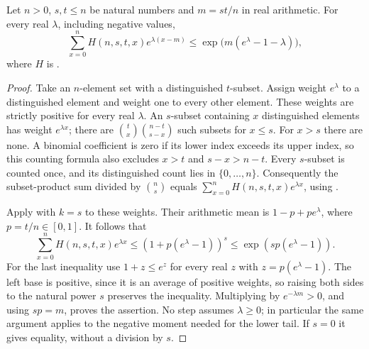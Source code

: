 \begin{lemma}
Let $n>0$, $s,t\le n$ be natural numbers and $m=st/n$ in real arithmetic.
For every real $\lambda$, including negative values,
\[
 \sum_{x=0}^n H(n,s,t,x)e^{\lambda(x-m)}
 \le \exp\bigl(m(e^\lambda-1-\lambda)\bigr),
\]
where $H$ is .
\end{lemma}
\begin{proof}
Take an $n$-element set with a distinguished $t$-subset. Assign weight
$e^\lambda$ to a distinguished element and weight one to every other
element. These weights are strictly positive for every real $\lambda$.
An $s$-subset containing $x$ distinguished elements has weight
$e^{\lambda x}$; there are
$\binom t x\binom{n-t}{s-x}$ such subsets for $x\le s$.
For $x>s$ there are none. A binomial coefficient is zero if its lower
index exceeds its upper index, so this counting formula also excludes
$x>t$ and $s-x>n-t$. Every $s$-subset is counted once, and its distinguished
count lies in $\{0,\ldots,n\}$. Consequently the subset-product sum divided
by $\binom n s$ equals
$\sum_{x=0}^n H(n,s,t,x)e^{\lambda x}$, using
.

Apply  with $k=s$ to these weights.
Their arithmetic mean is $1-p+pe^\lambda$, where $p=t/n\in[0,1]$.
It follows that
\[
 \sum_{x=0}^n H(n,s,t,x)e^{\lambda x}
 \le (1+p(e^\lambda-1))^s
 \le \exp(sp(e^\lambda-1)).
\]
For the last inequality use $1+z\le e^z$ for every real $z$ with
$z=p(e^\lambda-1)$. The left base is positive, since it is an average
of positive weights, so raising both sides to the natural power $s$
preserves the inequality. Multiplying by $e^{-\lambda m}>0$, and using
$sp=m$, proves the assertion. No step assumes $\lambda\ge0$; in
particular the same argument applies to the negative moment needed for
the lower tail. If $s=0$ it gives equality, without a division by $s$.
\end{proof}
